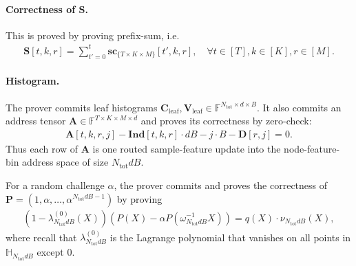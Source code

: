 \paragraph{Correctness of $\mathbf{S}$.}
This is proved by proving prefix-sum, i.e.
\begin{align}
    \mathbf{S}[t,k,r]
    =
    \sum_{t'=0}^{t}\mathbf{sc}_{\{T\times K\times M\}}[t',k,r],
    \quad
    \forall t\in[T], k\in[K], r\in[M].
\end{align}

\paragraph{Histogram.}
The prover commits leaf histograms
$\mathbf{C}_{\mathrm{leaf}},\mathbf{V}_{\mathrm{leaf}}
\in\mathbb{F}^{N_{\mathrm{tot}}\times d\times B}$.
It also commits an address tensor
$\mathbf{A}\in\mathbb{F}^{T\times K\times M\times d}$
and proves its correctness by zero-check:
\begin{align}
    \mathbf{A}[t,k,r,j]
    -\mathbf{Ind}[t,k,r]\cdot dB
    -j\cdot B
    -\mathbf{D}[r,j]
    =
    0.
\end{align}
Thus each row of $\mathbf{A}$ is one routed sample-feature update into the
node-feature-bin address space of size $N_{\mathrm{tot}}dB$.

For a random challenge $\alpha$, the prover commits and proves
the correctness of $\mathbf{P} = (1, \alpha, \dots, \alpha^{N_{\mathrm{tot}}dB-1})$ by proving
\begin{align}
    \left(1 - \lambda_{N_{\mathrm{tot}}dB}^{(0)}(X)\right) \left(P(X) - \alpha P(\omega^{-1}_{N_{\mathrm{tot}}dB}X)\right) = q(X)\cdot \nu_{N_{\mathrm{tot}}dB}(X),
\end{align}
where recall that $\lambda_{N_{\mathrm{tot}}dB}^{(0)}$ is the Lagrange polynomial that vanishes on all points in $\mathbb{H}_{N_{\mathrm{tot}}dB}$ except $0$.

